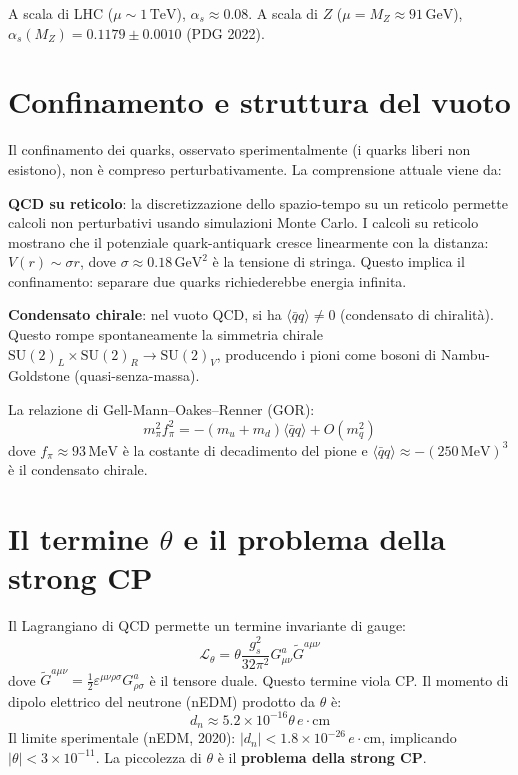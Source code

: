 \documentclass[11.5pt,a4paper,openany]{book}
\theoremstyle{remark}
\begin{document}
A scala di LHC ($\mu \sim 1\,\mathrm{TeV}$), $\alpha_s \approx 0.08$. A scala di $Z$ ($\mu = M_Z \approx 91\,\mathrm{GeV}$), $\alpha_s(M_Z) = 0.1179 \pm 0.0010$ (PDG 2022).

\section{Confinamento e struttura del vuoto}

Il confinamento dei quarks, osservato sperimentalmente (i quarks liberi non esistono), non è compreso perturbativamente. La comprensione attuale viene da:

\textbf{QCD su reticolo}: la discretizzazione dello spazio-tempo su un reticolo permette calcoli non perturbativi usando simulazioni Monte Carlo. I calcoli su reticolo mostrano che il potenziale quark-antiquark cresce linearmente con la distanza: $V(r) \sim \sigma r$, dove $\sigma \approx 0.18\,\mathrm{GeV}^2$ è la tensione di stringa. Questo implica il confinamento: separare due quarks richiederebbe energia infinita.

\textbf{Condensato chirale}: nel vuoto QCD, si ha $\langle\bar{q}q\rangle \neq 0$ (condensato di chiralità). Questo rompe spontaneamente la simmetria chirale $\mathrm{SU}(2)_L \times \mathrm{SU}(2)_R \to \mathrm{SU}(2)_V$, producendo i pioni come bosoni di Nambu-Goldstone (quasi-senza-massa).

La relazione di Gell-Mann--Oakes--Renner (GOR):
\[
m_\pi^2 f_\pi^2 = -(m_u + m_d)\langle\bar{q}q\rangle + O(m_q^2)
\]
dove $f_\pi \approx 93\,\mathrm{MeV}$ è la costante di decadimento del pione e $\langle\bar{q}q\rangle \approx -(250\,\mathrm{MeV})^3$ è il condensato chirale.

\section{Il termine $\theta$ e il problema della strong CP}

Il Lagrangiano di QCD permette un termine invariante di gauge:
\[
\mathcal{L}_\theta = \theta \frac{g_s^2}{32\pi^2} G^a_{\mu\nu}\tilde{G}^{a\mu\nu}
\]
dove $\tilde{G}^{a\mu\nu} = \frac{1}{2}\varepsilon^{\mu\nu\rho\sigma}G^a_{\rho\sigma}$ è il tensore duale. Questo termine viola CP. Il momento di dipolo elettrico del neutrone (nEDM) prodotto da $\theta$ è:
\[
d_n \approx 5.2 \times 10^{-16} \theta\,e\cdot\mathrm{cm}
\]
Il limite sperimentale (nEDM, 2020): $|d_n| < 1.8 \times 10^{-26}\,e\cdot\mathrm{cm}$, implicando $|\theta| < 3 \times 10^{-11}$. La piccolezza di $\theta$ è il \textbf{problema della strong CP}.
\end{document}
